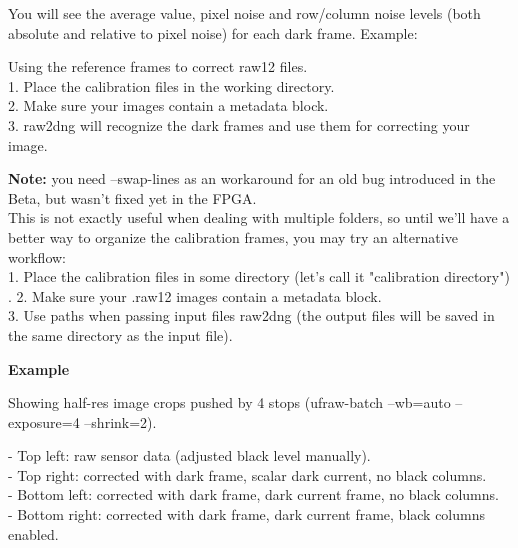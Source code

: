 
You will see the average value, pixel noise and row/column noise levels (both absolute and relative to pixel noise) for each dark frame. Example:

    
Using the reference frames to correct raw12 files.\\

1. Place the calibration files in the working directory.\\
2. Make sure your  images contain a metadata block.\\
3. raw2dng will recognize the dark frames and use them for correcting your image. \\
   
    
\textbf{Note:} you need --swap-lines as an workaround for an old bug introduced in the Beta, but wasn't fixed yet in the FPGA.\\    
    
This is not exactly useful when dealing with multiple folders, so until we'll have a better way to organize the calibration frames, you may try an alternative workflow:\\

1. Place the calibration files in some directory (let's call it "calibration directory")\\.
2. Make sure your .raw12 images contain a metadata block.\\
3. Use paths when passing input files raw2dng (the output files will be saved in the same directory as the input file).\\

     
    
\textbf{Example}

Showing half-res image crops pushed by 4 stops (ufraw-batch --wb=auto --exposure=4 --shrink=2).

- Top left: raw sensor data (adjusted black level manually).\\
- Top right: corrected with dark frame, scalar dark current, no black columns.\\
- Bottom left: corrected with dark frame, dark current frame, no black columns.\\
- Bottom right: corrected with dark frame, dark current frame, black columns enabled.\\


